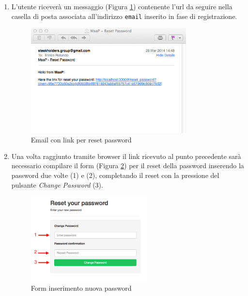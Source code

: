 \begin{enumerate}
			\item L'utente riceverà un messaggio (Figura \ref{fig:mailResetPwd}) contenente l'url da seguire nella casella di posta associata all'indirizzo \texttt{email} inserito in fase di registrazione. 

			\begin{figure}[H]
				\centering \includegraphics[width=0.8\textwidth]{img/mailResetPwd.png}
			\caption{ \label{fig:mailResetPwd} Email con link per reset password}
			\end{figure}

			\item Una volta raggiunto tramite browser il link ricevuto al punto precedente sarà necessario compilare il form (Figura \ref{fig:resetPwdForm}) per il reset della password inserendo la password due volte (1) e (2), completando il reset con la pressione del pulsante \emph{Change Password} (3).

			\begin{figure}[H]
				\centering \includegraphics[width=0.6\textwidth]{img/resetPwdForm.png}
			\caption{ \label{fig:resetPwdForm} Form inserimento nuova password}
			\end{figure}

		\end{enumerate}

